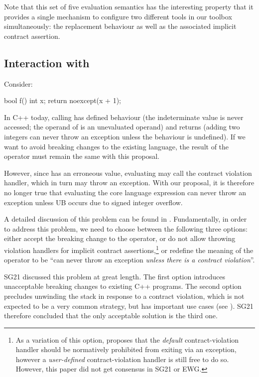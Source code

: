 {Note that this set of five evaluation semantics has the interesting property that it provides a single mechanism to configure two different tools in our toolbox simultaneously: the replacement behaviour as well as the associated implicit contract assertion.

\subsection{Interaction with }

Consider:
\begin{codeblock}
bool f() {
  int x;
  return noexcept(x + 1);
}
\end{codeblock}
In C++ today, calling  has defined behaviour (the indeterminate value is never accessed; the operand of  is an unevaluated operand) and returns  (adding two integers can never throw an exception unless the behaviour is undefined). If we want to avoid breaking changes to the existing language, the result of the  operator must remain the same with this proposal.

However, since  has an erroneous value, evaluating  may call the contract violation handler, which in turn may throw an exception. With our proposal, it is therefore no longer true that evaluating the core language expression  can never throw an exception unless UB occurs due to signed integer overflow.

A detailed discussion of this problem can be found in \cite{P3541R1}. Fundamentally, in order to address this problem, we need to choose between the following three options: either accept the breaking change to the  operator, or do not allow throwing violation handlers for implicit contract assertions,\footnote{As a variation of this option, \cite{P3577R0} proposes that the \emph{default} contract-violation handler should be normatively prohibited from exiting via an exception, however a \emph{user-defined} contract-violation handler is still free to do so. However, this paper did not get consensus in SG21 or EWG.} or redefine the meaning of the  operator to be ``can never throw an exception \emph{unless there is a contract violation}''. 

SG21 discussed this problem at great length. The first option introduces unacceptable breaking changes to existing C++ programs. The second option precludes unwinding the stack in response to a contract violation, which is not expected to be a very common strategy, but has important use cases (see \cite{P3318R0}). SG21 therefore concluded that the only acceptable solution is the third one. 

}
